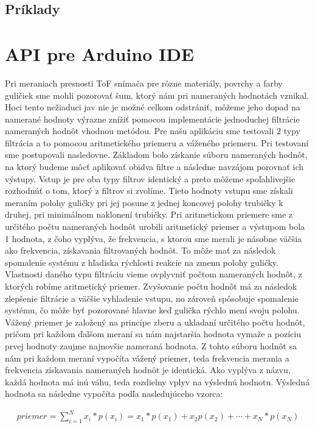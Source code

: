 \subsection{Príklady}
\label{kap:3.2.2}

\section{API pre Arduino IDE}
\label{kap:3.3}

Pri meraniach presnosti ToF snímača pre rôzne materiály, povrchy a farby guličiek sme mohli pozorovať šum, ktorý nám pri nameraných hodnotách vznikal. Hoci tento nežiaduci jav nie je možné celkom odstrániť, môžeme jeho dopad na namerané hodnoty výrazne znížiť pomocou implementácie jednoduchej filtrácie nameraných hodnôt vhodnou metódou.
Pre našu aplikáciu sme testovali 2 typy filtrácia a to pomocou aritmetického priemeru a váženého priemeru. Pri testovaní sme postupovali nasledovne. Základom bolo získanie súboru nameraných hodnôt, na ktorý budeme môcť aplikovať obidva filtre a následne navzájom porovnať ich výstupy. Vstup je pre oba typy filtrov identický a preto môžeme spoľahlivejšie rozhodnúť o tom, ktorý z filtrov si zvolíme. Tieto hodnoty vstupu sme získali meraním polohy guličky pri jej posune z jednej koncovej polohy trubičky k druhej, pri minimálnom naklonení trubičky. 
Pri aritmetickom priemere sme z určitého počtu nameraných hodnôt urobili aritmetický priemer a výstupom bola 1 hodnota, z čoho vyplýva, že frekvencia, s ktorou sme merali je násobne väčšia ako frekvencia, získavania filtrovaných hodnôt. To môže mať za následok spomalenie systému z hľadiska rýchlosti reakcie na zmenu polohy guličky. Vlastnosti daného typu filtráciu vieme ovplyvniť počtom nameraných hodnôt, z ktorých robíme aritmetický priemer. Zvyšovanie počtu hodnôt má za následok zlepšenie filtrácie a väčšie vyhladenie vstupu, no zároveň spôsobuje spomalenie systému, čo môže byť pozorované hlavne keď gulička rýchlo mení svoju polohu. 
Vážený priemer je založený na princípe zberu a ukladaní určitého počtu hodnôt, pričom pri každom ďalšom meraní sa nám najstaršia hodnota vymaže a pozíciu prvej hodnoty zaujme najnovšie nameraná hodnota. Z tohto súboru hodnôt sa nám pri každom meraní vypočíta vážený priemer, teda frekvencia merania a frekvencia získavania nameraných hodnôt je identická. Ako vyplýva z názvu, každá hodnota má inú váhu, teda rozdielny vplyv na výslednú hodnotu.  Výsledná hodnota sa následne vypočíta podľa nasledujúceho vzorca:


\begin{align}
	\label{rovnica.3.3.1}
	priemer = \sum_{i=1}^{N}x_i*p(x_i)= x_1*p(x_1)+x_2p(x_2)+\cdots +x_N*p(x_N)
\end{align}

